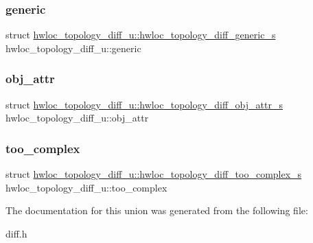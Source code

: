 \subsubsection{\texorpdfstring{generic}{generic}}
{\footnotesize\ttfamily struct \hyperlink{a00354}{hwloc\+\_\+topology\+\_\+diff\+\_\+u\+::hwloc\+\_\+topology\+\_\+diff\+\_\+generic\+\_\+s}  hwloc\+\_\+topology\+\_\+diff\+\_\+u\+::generic}

\mbox{\label{a00350_a7245713f0f49e9f08fda28401a4f98fd}} 
\subsubsection{\texorpdfstring{obj\+\_\+attr}{obj\_attr}}
{\footnotesize\ttfamily struct \hyperlink{a00358}{hwloc\+\_\+topology\+\_\+diff\+\_\+u\+::hwloc\+\_\+topology\+\_\+diff\+\_\+obj\+\_\+attr\+\_\+s}  hwloc\+\_\+topology\+\_\+diff\+\_\+u\+::obj\+\_\+attr}

\mbox{\label{a00350_adaaabee4029a455119ec3695c19632d6}} 
\subsubsection{\texorpdfstring{too\+\_\+complex}{too\_complex}}
{\footnotesize\ttfamily struct \hyperlink{a00362}{hwloc\+\_\+topology\+\_\+diff\+\_\+u\+::hwloc\+\_\+topology\+\_\+diff\+\_\+too\+\_\+complex\+\_\+s}  hwloc\+\_\+topology\+\_\+diff\+\_\+u\+::too\+\_\+complex}



The documentation for this union was generated from the following file\+:\begin{DoxyCompactItemize}
\item 
diff.\+h\end{DoxyCompactItemize}
